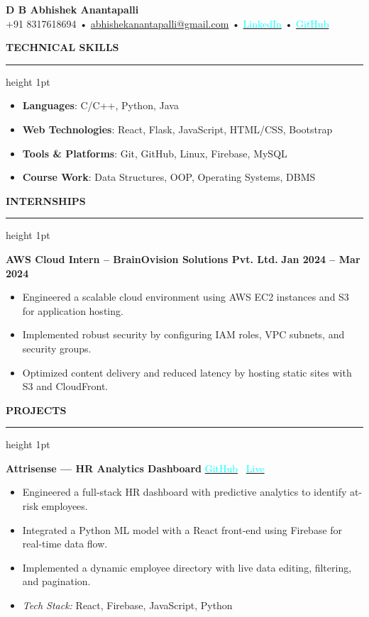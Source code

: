 \documentclass[10pt,a4paper]{article}
\newenvironment{tightitemize}{
  \begin{itemize}[leftmargin=25pt, itemsep=2pt, parsep=2pt, topsep=2pt, partopsep=0pt]
  \addtolength{\leftskip}{14pt} %
}{
  \end{itemize}
}
\newcommand{\compactspace}{\vspace{5pt}}
\newcommand{\sectiongap}{\vspace{10pt}}
\newcommand{\header}[2]{
    \begin{center}
        {\Huge \textbf{#1}} \\
        \compactspace
        {\normalsize #2}
    \end{center}
}
\newcommand{\resumesection}[1]{
    \sectiongap
    {\color{primary} \large \textbf{#1}} \\
    \hrule height 1pt \compactspace
}
\begin{document}
\header{D B Abhishek Anantapalli}
{+91 8317618694 \hspace{8pt}• \href{mailto:abhishekanantapalli@gmail.com}{abhishekanantapalli@gmail.com} \hspace{8pt}•  
\href{https://www.linkedin.com/in/abhishekanantapalli/}{\textcolor{cyan}{LinkedIn}} \hspace{8pt}•  
\href{https://github.com/AbhiAnantapalli215}{\textcolor{cyan}{GitHub}}}
\resumesection{TECHNICAL SKILLS}
\begin{itemize}
    \item \textbf{Languages}: C/C++, Python, Java
    \item \textbf{Web Technologies}: React, Flask, JavaScript, HTML/CSS, Bootstrap
    \item \textbf{Tools \& Platforms}: Git, GitHub, Linux, Firebase, MySQL
    \item \textbf{Course Work}: Data Structures, OOP, Operating Systems, DBMS
\end{itemize}

\resumesection{INTERNSHIPS}
\textbf{AWS Cloud Intern – BrainOvision Solutions Pvt. Ltd.} \hfill \textbf{Jan 2024 -- Mar 2024}
\begin{tightitemize}
    \item Engineered a scalable cloud environment using AWS EC2 instances and S3 for application hosting.
    \item Implemented robust security by configuring IAM roles, VPC subnets, and security groups.
    \item Optimized content delivery and reduced latency by hosting static sites with S3 and CloudFront.
\end{tightitemize}

\resumesection{PROJECTS}

\textbf{Attrisense — HR Analytics Dashboard} \hfill  
\href{https://github.com/AbhiAnantapalli215/Attrisense}{\textcolor{cyan}{GitHub}} \textbar\  
\href{https://attrisense.web.app}{\textcolor{cyan}{Live}}
\begin{tightitemize}
    \item Engineered a full-stack HR dashboard with predictive analytics to identify at-risk employees.
    \item Integrated a Python ML model with a React front-end using Firebase for real-time data flow.
    \item Implemented a dynamic employee directory with live data editing, filtering, and pagination.
    \item \textit{Tech Stack:} React, Firebase, JavaScript, Python
\end{tightitemize}
\end{document}
